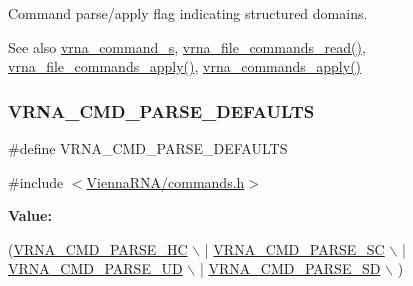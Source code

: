 Command parse/apply flag indicating structured domains. 

\begin{DoxySeeAlso}{See also}
\hyperlink{group__file__utils_structvrna__command__s}{vrna\+\_\+command\+\_\+s}, \hyperlink{group__file__utils_ga5d2a64331cff5b1059e7d327545d8a63}{vrna\+\_\+file\+\_\+commands\+\_\+read()}, \hyperlink{group__file__utils_gadbe8c9622f7bcc6dcbe3448b98df8656}{vrna\+\_\+file\+\_\+commands\+\_\+apply()}, \hyperlink{group__file__utils_ga5e993fc4b9602af73aaaab4d3b3cd9a9}{vrna\+\_\+commands\+\_\+apply()} 
\end{DoxySeeAlso}
\mbox{\label{group__file__utils_ga0a6c88e21e366dca14958d69cd024008}} 
\subsubsection{\texorpdfstring{V\+R\+N\+A\+\_\+\+C\+M\+D\+\_\+\+P\+A\+R\+S\+E\+\_\+\+D\+E\+F\+A\+U\+L\+TS}{VRNA\_CMD\_PARSE\_DEFAULTS}}
{\footnotesize\ttfamily \#define V\+R\+N\+A\+\_\+\+C\+M\+D\+\_\+\+P\+A\+R\+S\+E\+\_\+\+D\+E\+F\+A\+U\+L\+TS}



{\ttfamily \#include $<$\hyperlink{commands_8h}{Vienna\+R\+N\+A/commands.\+h}$>$}

{\bfseries Value\+:}
\begin{DoxyCode}
(\hyperlink{group__file__utils_gac54dec838d7b6bebd5df85f71702d324}{VRNA\_CMD\_PARSE\_HC} \(\backslash\)
                                 | \hyperlink{group__file__utils_ga8cad3c1f83e6f149829c49a186a83e21}{VRNA\_CMD\_PARSE\_SC} \(\backslash\)
                                 | \hyperlink{group__file__utils_ga6c6409780698826b04ebfed9151d7649}{VRNA\_CMD\_PARSE\_UD} \(\backslash\)
                                 | \hyperlink{group__file__utils_gaf5e20210173cdb83bf70256a454f284b}{VRNA\_CMD\_PARSE\_SD} \(\backslash\)
                                 )
\end{DoxyCode}


